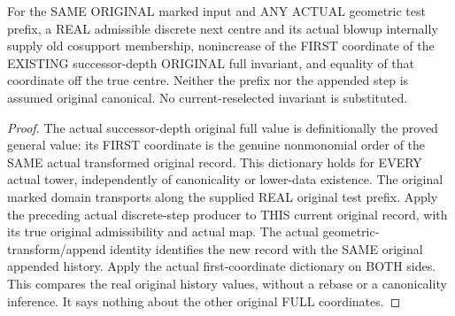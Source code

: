 \begin{theorem}
\label{hir:original-successor-full-first-entry-discrete-preparation-comparison}
\leanok
For the SAME ORIGINAL marked input and ANY ACTUAL geometric test prefix,
a REAL admissible discrete next centre and its actual blowup internally
supply old cosupport membership, nonincrease of the FIRST coordinate of
the EXISTING successor-depth ORIGINAL full invariant, and equality of that
coordinate off the true centre. Neither the prefix nor the appended step
is assumed original canonical. No current-reselected invariant is substituted.
\end{theorem}
\begin{proof}
The actual successor-depth original full value is definitionally the
proved general value: its FIRST coordinate is the genuine nonmonomial
order of the SAME actual transformed original record. This dictionary
holds for EVERY actual tower, independently of canonicality or lower-data
existence. The original marked domain transports along the supplied REAL
original test prefix. Apply the preceding actual discrete-step producer
to THIS current original record, with its true original admissibility and
actual map. The actual geometric-transform/append identity identifies
the new record with the SAME original appended history. Apply the actual
first-coordinate dictionary on BOTH sides. This compares the real original
history values, without a rebase or a canonicality inference. It says
nothing about the other original FULL coordinates.
\end{proof}


